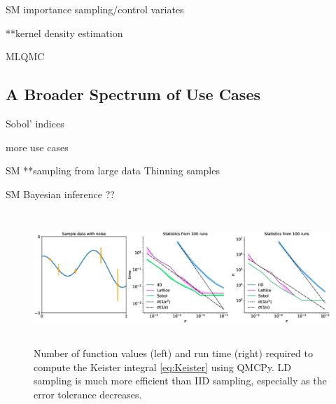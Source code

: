 \documentclass[11pt]{NSFamsart}
\begin{document}
SM importance sampling/control variates

**kernel density estimation

MLQMC

\subsection{A Broader Spectrum of Use Cases}

Sobol' indices

more use cases

SM **sampling from large data
Thinning samples

SM Bayesian inference ??

\cite{BinSur13}

\begin{figure}[H]
	\centering
	\includegraphics[height = 5cm]{ProgramsImages/qEI_cost_comp_time.eps}
	\caption{Number of function values (left) and run time (right) required to compute the Keister integral \eqref{eq:Keister} using QMCPy.  LD sampling is much more efficient than IID sampling, especially as the error tolerance decreases.}
	\label{fig:qei}
\end{figure}
\end{document}
